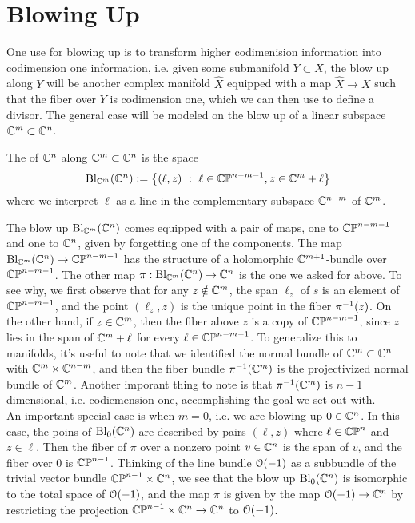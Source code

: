 %
\section{Blowing Up}
%
One use for blowing up is to transform higher codimenision information into
codimension one information, i.e. given some submanifold $Y \subset X$, the
blow up along $Y$ will be another complex manifold $\widehat{X}$ equipped with
a map $\widehat{X} \to X$ such that the fiber over $Y$ is codimension one,
which we can then use to define a divisor. The general case will be modeled
on the blow up of a linear subspace $\mathbb{C}^m \subset \mathbb{C}^n$.
%
\begin{defn}
The  of $\mathbb{C}^n$ along $\mathbb{C}^m \subset \mathbb{C}^n$ is the space
\[
\mathrm{Bl}_{\mathbb{C}^m}(\mathbb{C}^n) \vcentcolon= \left\lbrace (\ell,z)
~:~ \ell \in \mathbb{CP}^{n-m-1}, z \in \mathbb{C}^m + \ell \right\rbrace
\]
where we interpret $\ell$ as a line in the complementary subspace $\mathbb{C}^{n-m}$ of $\mathbb{C}^m$.
\end{defn}
%
The blow up $\mathrm{Bl}_{\mathbb{C}^m}(\mathbb{C}^n)$ comes equipped with a pair of maps,
one to $\mathbb{CP}^{n-m-1}$ and one to $\mathbb{C}^n$, given by forgetting one of the components.
The map $\mathrm{Bl}_{\mathbb{C}^m}(\mathbb{C}^n) \to \mathbb{CP}^{n-m-1}$ has the structure of a holomorphic
$\mathbb{C}^{m+1}$-bundle over $\mathbb{CP}^{n-m-1}$. The other map
$\pi : \mathrm{Bl}_{\mathbb{C}^m}(\mathbb{C}^n) \to \mathbb{C}^n$ is the one we asked for above. To
see why, we first observe that for any $z \notin \mathbb{C}^m$, the span $\ell_z$ of $s$
is an element of $\mathbb{CP}^{n-m-1}$, and the point $(\ell_z,z)$ is the unique
point in the fiber $\pi^{-1}(z)$. On the other hand, if $z \in \mathbb{C}^m$, then
the fiber above $z$ is a copy of $\mathbb{CP}^{n-m-1}$, since $z$ lies
in the span of $\mathbb{C}^m + \ell$ for every $\ell \in \mathbb{CP}^{n-m-1}$. To
generalize this to manifolds, it's useful to note that we identified the
normal bundle of $\mathbb{C}^m \subset \mathbb{C}^n$ with $\mathbb{C}^m \times \mathbb{C}^{n-m}$, and then
the fiber bundle $\pi^{-1}(\mathbb{C}^m)$ is the projectivized normal bundle of $\mathbb{C}^m$.
Another imporant thing to note is that $\pi^{-1}(\mathbb{C}^m)$ is $n-1$ dimensional,
i.e. codiemension one, accomplishing the goal we set out with.\\

An important special case is when $m = 0$, i.e. we are blowing up $0 \in \mathbb{C}^n$.
In this case, the poins of $\mathrm{Bl}_0(\mathbb{C}^n)$ are described by pairs
$(\ell,z)$ where $\ell \in \mathbb{CP}^n$ and $z \in \ell$. Then the fiber of
$\pi$ over a nonzero point $v \in \mathbb{C}^n$ is the span of $v$, and the fiber
over $0$ is $\mathbb{CP}^{n-1}$. Thinking of the line bundle $\mathcal{O}(-1)$ as a subbundle
of the trivial vector bundle $\mathbb{CP}^{n-1} \times \mathbb{C}^n$, we see that
the blow up $\mathrm{Bl}_0(\mathbb{C}^n)$ is isomorphic to the total space of $\mathcal{O}(-1)$,
and the map $\pi$ is given by the map $\mathcal{O}(-1) \to \mathbb{C}^n$ by restricting the
projection $\mathbb{CP}^{n-1} \times \mathbb{C}^n \to \mathbb{C}^n$ to $\mathcal{O}(-1)$. \\

